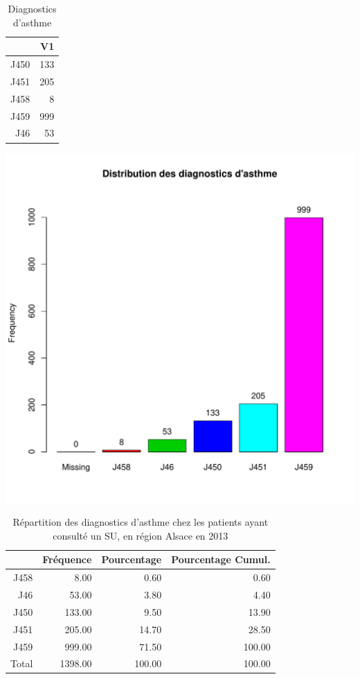 \documentclass[12pt,english,french,twoside]{book}\usepackage[]{graphicx}\usepackage[]{color}
\makeatletter
\def\maxwidth{ %
  \ifdim\Gin@nat@width>\linewidth
    \linewidth
  \else
    \Gin@nat@width
  \fi
}
\makeatother
\begin{document}
\begin{table}[ht]
\centering
\begin{tabular}{rr}
  \hline
 & V1 \\ 
  \hline
J450 & 133 \\ 
  J451 & 205 \\ 
  J458 &   8 \\ 
  J459 & 999 \\ 
  J46 &  53 \\ 
   \hline
\end{tabular}
\caption[]{Diagnostics d'asthme} 
\end{table}

\includegraphics[width=\maxwidth]{figure/asthme-1} 
\begin{table}[ht]
\centering
\begin{tabular}{rrrr}
  \hline
 & Fréquence & Pourcentage & Pourcentage Cumul. \\ 
  \hline
J458 & 8.00 & 0.60 & 0.60 \\ 
  J46 & 53.00 & 3.80 & 4.40 \\ 
  J450 & 133.00 & 9.50 & 13.90 \\ 
  J451 & 205.00 & 14.70 & 28.50 \\ 
  J459 & 999.00 & 71.50 & 100.00 \\ 
    Total & 1398.00 & 100.00 & 100.00 \\ 
   \hline
\end{tabular}
\caption[Répartition des diagnostics d'asthme]{Répartition des diagnostics d'asthme chez les patients ayant consulté un  SU, en région Alsace en 2013} 
\label{tab:asthme}
\end{table}
\end{document}
